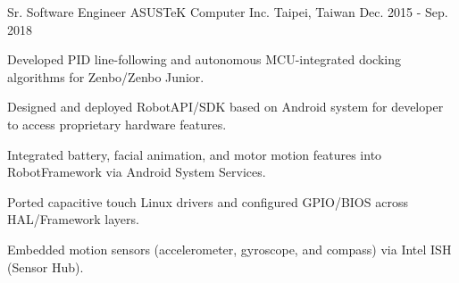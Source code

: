 \begin{cventries}
  \cventry
    {Sr. Software Engineer} %
    {ASUSTeK Computer Inc.} %
    {Taipei, Taiwan} %
    {Dec. 2015 - Sep. 2018} %
    {
      \begin{cvitems} %
        \item {Developed PID line-following and autonomous MCU-integrated docking algorithms for Zenbo/Zenbo Junior.}
        \item {Designed and deployed RobotAPI/SDK based on Android system for developer to access proprietary hardware features.}
        \item {Integrated battery, facial animation, and motor motion features into RobotFramework via Android System Services.}
        \item {Ported capacitive touch Linux drivers and configured GPIO/BIOS across HAL/Framework layers.}
        \item {Embedded motion sensors (accelerometer, gyroscope, and compass) via Intel ISH (Sensor Hub).}
      \end{cvitems}
    }

\end{cventries}
